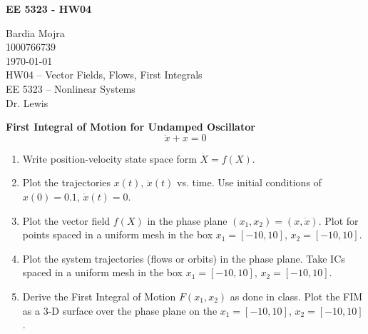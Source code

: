 \documentclass{homeworg}
\begin{document}

\begin{center}
\textbf{EE 5323 - HW04}\\
\end{center}

\noindent
Bardia Mojra\\
1000766739\\
\today\\
HW04 -- Vector Fields, Flows, First Integrals\\
EE 5323 -- Nonlinear Systems\\
Dr. Lewis

\exercise
\noindent
\textbf{First Integral of Motion for Undamped Oscillator}\\
\begin{equation*}
\ddot{x} + x = 0
\end{equation*}

\begin{enumerate}[label=(\alph*)]
  \item Write position-velocity state space form \(\dot{X} = f(X)\).
  \item Plot the trajectories \(x(t)\), \(\dot{x}(t)\) vs. time. Use initial conditions of \(x(0)=0.1\), \(\dot{x}(t)=0\).
  \item Plot the vector field \(f(X)\) in the phase plane \((x_1, x_2)=(x, \dot{x})\). Plot for points spaced in a uniform mesh in the box \(x_1=[-10,10]\), \(x_2=[-10,10]\).
  \item Plot the system trajectories (flows or orbits) in the phase plane. Take ICs spaced in a uniform mesh in the box \(x_1=[-10,10]\), \(x_2=[-10,10]\).
  \item Derive the First Integral of Motion \(F(x_1,x_2)\) as done in class. Plot the FIM as a 3-D surface over the phase plane on the \(x_1=[-10,10]\), \(x_2=[-10,10]\).
\end{enumerate}
\end{document}
